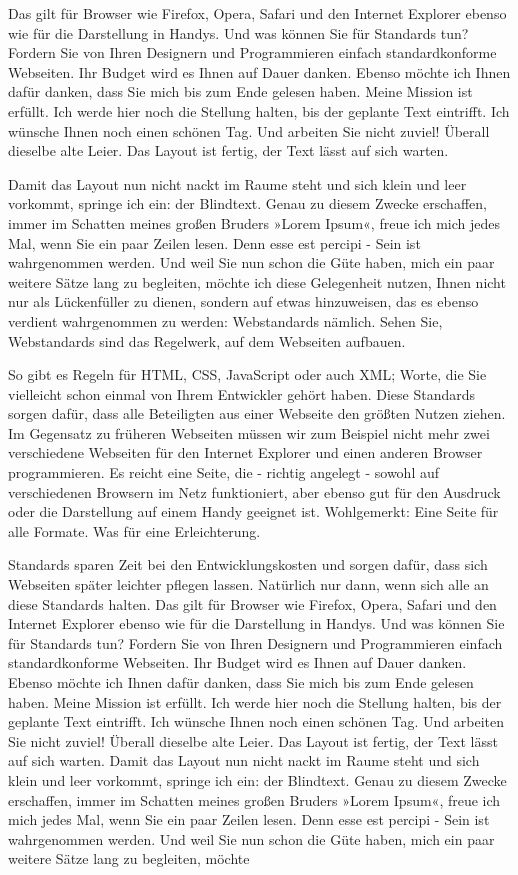 Das gilt für Browser wie Firefox, Opera, Safari und den Internet Explorer ebenso wie für die Darstellung in Handys. Und was können Sie für Standards tun? Fordern Sie von Ihren Designern und Programmieren einfach standardkonforme Webseiten. Ihr Budget wird es Ihnen auf Dauer danken. Ebenso möchte ich Ihnen dafür danken, dass Sie mich bis zum Ende gelesen haben. Meine Mission ist erfüllt. Ich werde hier noch die Stellung halten, bis der geplante Text eintrifft. Ich wünsche Ihnen noch einen schönen Tag. Und arbeiten Sie nicht zuviel! Überall dieselbe alte Leier. Das Layout ist fertig, der Text lässt auf sich warten.

Damit das Layout nun nicht nackt im Raume steht und sich klein und leer vorkommt, springe ich ein: der Blindtext. Genau zu diesem Zwecke erschaffen, immer im Schatten meines großen Bruders »Lorem Ipsum«, freue ich mich jedes Mal, wenn Sie ein paar Zeilen lesen. Denn esse est percipi - Sein ist wahrgenommen werden. Und weil Sie nun schon die Güte haben, mich ein paar weitere Sätze lang zu begleiten, möchte ich diese Gelegenheit nutzen, Ihnen nicht nur als Lückenfüller zu dienen, sondern auf etwas hinzuweisen, das es ebenso verdient wahrgenommen zu werden: Webstandards nämlich. Sehen Sie, Webstandards sind das Regelwerk, auf dem Webseiten aufbauen.

So gibt es Regeln für HTML, CSS, JavaScript oder auch XML; Worte, die Sie vielleicht schon einmal von Ihrem Entwickler gehört haben. Diese Standards sorgen dafür, dass alle Beteiligten aus einer Webseite den größten Nutzen ziehen. Im Gegensatz zu früheren Webseiten müssen wir zum Beispiel nicht mehr zwei verschiedene Webseiten für den Internet Explorer und einen anderen Browser programmieren. Es reicht eine Seite, die - richtig angelegt - sowohl auf verschiedenen Browsern im Netz funktioniert, aber ebenso gut für den Ausdruck oder die Darstellung auf einem Handy geeignet ist. Wohlgemerkt: Eine Seite für alle Formate. Was für eine Erleichterung.

Standards sparen Zeit bei den Entwicklungskosten und sorgen dafür, dass sich Webseiten später leichter pflegen lassen. Natürlich nur dann, wenn sich alle an diese Standards halten. Das gilt für Browser wie Firefox, Opera, Safari und den Internet Explorer ebenso wie für die Darstellung in Handys. Und was können Sie für Standards tun? Fordern Sie von Ihren Designern und Programmieren einfach standardkonforme Webseiten. Ihr Budget wird es Ihnen auf Dauer danken. Ebenso möchte ich Ihnen dafür danken, dass Sie mich bis zum Ende gelesen haben. Meine Mission ist erfüllt. Ich werde hier noch die Stellung halten, bis der geplante Text eintrifft. Ich wünsche Ihnen noch einen schönen Tag. Und arbeiten Sie nicht zuviel! Überall dieselbe alte Leier. Das Layout ist fertig, der Text lässt auf sich warten. Damit das Layout nun nicht nackt im Raume steht und sich klein und leer vorkommt, springe ich ein: der Blindtext. Genau zu diesem Zwecke erschaffen, immer im Schatten meines großen Bruders »Lorem Ipsum«, freue ich mich jedes Mal, wenn Sie ein paar Zeilen lesen. Denn esse est percipi - Sein ist wahrgenommen werden. Und weil Sie nun schon die Güte haben, mich ein paar weitere Sätze lang zu begleiten, möchte
